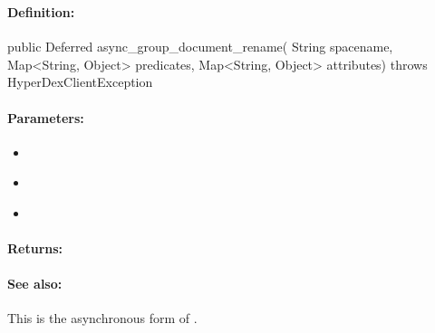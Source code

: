 \pagebreak
\subsubsection{}
\label{api:java:async_group_document_rename}


\paragraph{Definition:}
\begin{javacode}
public Deferred async_group_document_rename(
        String spacename,
        Map<String, Object> predicates,
        Map<String, Object> attributes) throws HyperDexClientException
\end{javacode}

\paragraph{Parameters:}
\begin{itemize}[noitemsep]
\item {}\\

\item {}\\

\item {}\\

\end{itemize}

\paragraph{Returns:}


\paragraph{See also:}  This is the asynchronous form of .

\pagebreak
\subsubsection{}
\label{api:java:document_rename}


